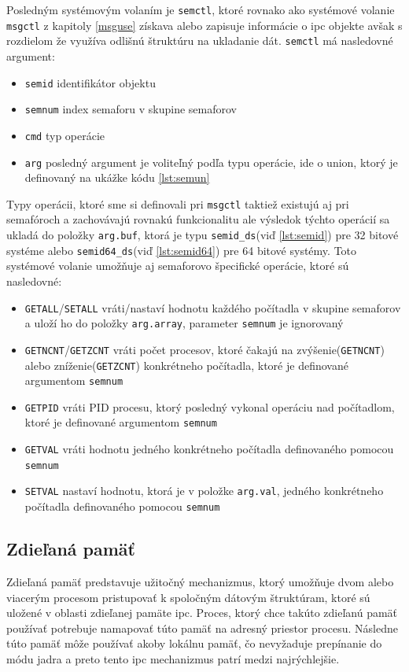 Posledným systémovým volaním je \texttt{semctl}, ktoré rovnako ako systémové volanie \texttt{msgctl} z kapitoly \ref{msguse} získava alebo zapisuje informácie o \acrshort{ipc} objekte avšak s rozdielom že využíva odlišnú štruktúru na ukladanie dát. \texttt{semctl} má nasledovné argument\cite{semctl}:
\begin{itemize}
\item \texttt{semid} identifikátor objektu
\item \texttt{semnum} index semaforu v skupine semaforov
\item \texttt{cmd} typ operácie
\item \texttt{arg} posledný argument je voliteľný podľa typu operácie, ide o union, ktorý je definovaný na ukážke kódu \ref{lst:semun}
\end{itemize}
Typy operácii, ktoré sme si definovali pri \texttt{msgctl} taktiež existujú aj pri semafóroch a zachovávajú rovnakú funkcionalitu ale výsledok týchto operácií sa ukladá do položky \texttt{arg.buf}, ktorá je typu \texttt{semid\_ds}(viď \ref{lst:semid}) pre 32 bitové systéme alebo \texttt{semid64\_ds}(viď \ref{lst:semid64}) pre 64 bitové systémy. Toto systémové volanie umožňuje aj semaforovo špecifické operácie, ktoré sú nasledovné\cite{semctl}:
\begin{itemize}
\item \texttt{GETALL}/\texttt{SETALL} vráti/nastaví hodnotu každého počítadla v skupine semaforov a uloží ho do položky \texttt{arg.array}, parameter \texttt{semnum} je ignorovaný
\item \texttt{GETNCNT}/\texttt{GETZCNT} vráti počet procesov, ktoré čakajú na zvýšenie(\texttt{GETNCNT}) alebo zníženie(\texttt{GETZCNT}) konkrétneho počítadla, ktoré je definované argumentom \texttt{semnum}
\item \texttt{GETPID} vráti PID procesu, ktorý posledný vykonal operáciu nad počítadlom, ktoré je definované argumentom \texttt{semnum}
\item \texttt{GETVAL} vráti hodnotu jedného konkrétneho počítadla definovaného pomocou \texttt{semnum}
\item \texttt{SETVAL} nastaví hodnotu, ktorá je v položke \texttt{arg.val}, jedného konkrétneho počítadla definovaného pomocou \texttt{semnum}
\end{itemize}
\subsection{Zdieľaná pamäť}
Zdieľaná pamäť predstavuje užitočný mechanizmus, ktorý umožňuje dvom alebo viacerým procesom pristupovať k spoločným dátovým štruktúram, ktoré sú uložené v oblasti zdieľanej pamäte \acrshort{ipc}.\cite{linux} Proces, ktorý chce takúto zdieľanú pamäť používať potrebuje namapovať túto pamäť na adresný priestor procesu. Následne túto pamäť môže používať akoby lokálnu pamäť, čo nevyžaduje prepínanie do módu jadra a preto tento \acrshort{ipc} mechanizmus patrí medzi najrýchlejšie.\cite{newlinux}
